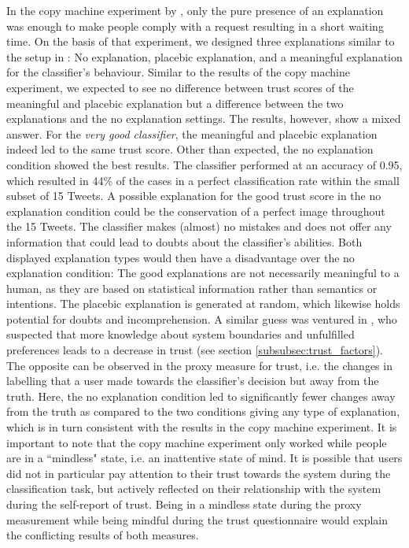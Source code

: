 In the copy machine experiment by \cite{langer1978mindlessness}, only the pure presence of an explanation was enough to make people comply with a request resulting in a short waiting time. On the basis of that experiment, we designed three explanations similar to the setup in \cite{langer1978mindlessness}: No explanation, placebic explanation, and a meaningful explanation for the classifier's behaviour. Similar to the results of the copy machine experiment, we expected to see no difference between trust scores of the meaningful and placebic explanation but a difference between the two explanations and the no explanation settings. The results, however, show a mixed answer.\newline
For the \textit{very good classifier}, the meaningful and placebic explanation indeed led to the same trust score. Other than expected, the no explanation condition showed the best results. The classifier performed at an accuracy of 0.95, which resulted in 44\% of the cases in a perfect classification rate within the small subset of 15 Tweets. A possible explanation for the good trust score in the no explanation condition could be the conservation of a perfect image throughout the 15 Tweets. The classifier makes (almost) no mistakes and does not offer any information that could lead to doubts about the classifier's abilities. Both displayed explanation types would then have a disadvantage over the no explanation condition: The good explanations are not necessarily meaningful to a human, as they are based on statistical information rather than semantics or intentions. The placebic explanation is generated at random, which likewise holds potential for doubts and incomprehension. A similar guess was ventured in \cite{cramer2008effects}, who suspected that more knowledge about system boundaries and unfulfilled preferences leads to a decrease in trust (see section \ref{subsubsec:trust_factors}). The opposite can be observed in the proxy measure for trust, i.e. the changes in labelling that a user made towards the classifier's decision but away from the truth. Here, the no explanation condition led to significantly fewer changes away from the truth as compared to the two conditions giving any type of explanation, which is in turn consistent with the results in the copy machine experiment. It is important to note that the copy machine experiment only worked while people are in a ``mindless" state, i.e. an inattentive state of mind. It is possible that users did not in particular pay attention to their trust towards the system during the classification task, but actively reflected on their relationship with the system during the self-report of trust. Being in a mindless state during the proxy measurement while being mindful during the trust questionnaire would explain the conflicting results of both measures.\newline
